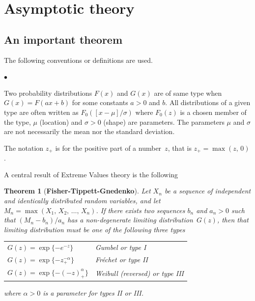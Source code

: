\documentclass[a4paper]{report}
\begin{document}
\section{Asymptotic theory}
\label{ASYMPTGEV}

\subsection{An important theorem}

The following conventions or definitions are used.

\begin{list}{$\bullet$}{\setlength{\itemsep}{2pt}\setlength{\topsep}{2pt}}
  
\item Two probability distributions $F(x)$ and $G(x)$ are of same type
  when $G(x) = F(ax + b)$ for some constants $a>0$ and $b$. All
  distributions of a given type are often written as
  $F_0([x-\mu]/\sigma)$ where $F_0(z)$ is a chosen member of the type,
  $\mu$ (location) and $\sigma>0$ (shape) are parameters. The
  parameters $\mu$ and $\sigma$ are not necessarily the mean nor the
  standard deviation.

\item  The notation $z_+$ is for the positive part of a number~$z$, that is
  $z_+ =\max(z,\,0)$. 

\end{list}

A central result of Extreme Values theory is the following

\newtheorem*{theo}{Theorem}
\begin{theo}[\textbf{Fisher-Tippett-Gnedenko}]
  
  Let $X_n$ be a sequence of independent and identically distributed
  random variables, and let $M_n=\max(X_1,\,X_2,\,\dots,\,X_n)$. If
  there exists two sequences $b_n$ and $a_n>0$ such that
  $(M_n-b_n)/a_n$ has a non-degenerate limiting distribution~$G(z)$,
  then that limiting distribution must be one of the following three
  types
  \begin{center}
    \begin{tabular}{l l}
      $G(z) = \exp\{-e^{-z}\}$       &Gumbel or type I\\
      $G(z) = \exp\{-z_+^{-\alpha}\}$ &Fr\'echet or type II\\
      $G(z) = \exp\{-(-z)_+^\alpha\}$ &Weibull (reversed) or type III
    \end{tabular}
  \end{center}
  where $\alpha >0$ is a parameter for types II or III.
  
\end{theo}
\end{document}
